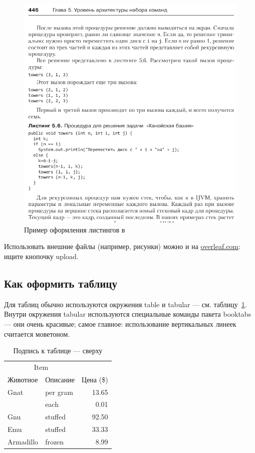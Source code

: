 \begin{figure}[p]%
\centering
\includegraphics[width=\textwidth]{img/tan-aus.png}
\caption{\label{fig:tan-aus}Пример оформления листингов в~\autocite{TanAus2013}}
\end{figure}

Использовать внешние файлы (например, рисунки) можно и на \href{http://overleaf.com}{overleaf.com}: ищите кнопочку upload.

\subsection{Как оформить таблицу}

Для таблиц обычно используются окружения table и tabular --- см. таблицу~\ref{tab:widgets}. Внутри окружения tabular используются специальные команды пакета booktabs — они очень красивые; самое главное: использование вертикальных линеек считается моветоном.

\begin{table}
\centering
\caption{\label{tab:widgets}Подпись к таблице --- сверху}
\begin{tabular}{llr}
\toprule
\multicolumn{2}{c}{Item} \\
\cmidrule(r){1-2}
Животное  & Описание    & Цена (\$) \\
\midrule
Gnat      & per gram    & 13.65      \\
          & each        & 0.01       \\
Gnu       & stuffed     & 92.50      \\
Emu       & stuffed     & 33.33      \\
Armadillo & frozen      & 8.99       \\
\bottomrule
\end{tabular}
\end{table}

